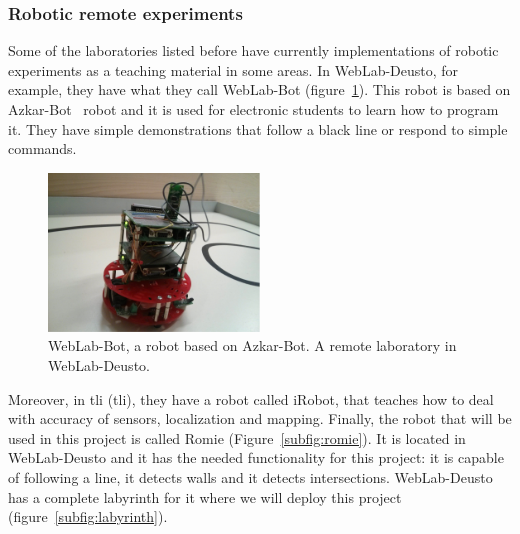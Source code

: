 \subsubsection{Robotic remote experiments}

Some of the laboratories listed before have currently implementations of robotic experiments as a
teaching material in some areas. In WebLab-Deusto, for example, they have what they call WebLab-Bot
(figure~\ref{fig:weblab-bot}). This robot is based on Azkar-Bot~\cite{azkar_bot} robot and it is
used for electronic students to learn how to program it. They have simple demonstrations that follow
a black line or respond to simple commands.

\begin{figure}[ht]
	\centering
	\includegraphics[width=0.5\textwidth]{fig/weblab-bot}
	\caption{WebLab-Bot, a robot based on Azkar-Bot. A remote laboratory in WebLab-Deusto.}
	\label{fig:weblab-bot}
\end{figure}

Moreover, in \acrlong{tli} (\acrshort{tli}), they have a robot called iRobot, that teaches how to
deal with accuracy of sensors, localization and mapping. Finally, the robot that will be used in
this project is called Romie (Figure~\ref{subfig:romie}). It is located in WebLab-Deusto and it has
the needed functionality for this project: it is capable of following a line, it detects walls and
it detects intersections. WebLab-Deusto has a complete labyrinth for it where we will deploy this
project (figure~\ref{subfig:labyrinth}).

